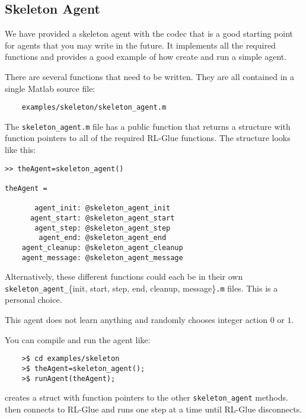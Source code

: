 \documentclass[11pt]{article}
\begin{document}
\subsection{Skeleton Agent}
\label{sec:agent}
We have provided a skeleton agent with the codec that is a good starting point for agents that you may write in the future.
It implements all the required functions and provides a good example of how create and run a simple agent.

There are several functions that need to be written. They are all contained in a single Matlab source file:
\begin{verbatim}
	examples/skeleton/skeleton_agent.m
\end{verbatim}

The \texttt{skeleton\_agent.m} file has a public function that returns a structure with function pointers to all of the required RL-Glue functions.  The structure looks like this:

\begin{verbatim}
>> theAgent=skeleton_agent()

theAgent = 

       agent_init: @skeleton_agent_init
      agent_start: @skeleton_agent_start
       agent_step: @skeleton_agent_step
        agent_end: @skeleton_agent_end
    agent_cleanup: @skeleton_agent_cleanup
    agent_message: @skeleton_agent_message
\end{verbatim}

Alternatively, these different functions could each be in their own \texttt{skeleton\_agent\_}\{init, start, step, end, cleanup, message\}\texttt{.m} files.  This is a personal choice.

This agent does not learn anything and randomly chooses integer action $0$ or $1$.  

You can compile and run the agent like:
\begin{verbatim}
	>$ cd examples/skeleton
	>$ theAgent=skeleton_agent();
	>$ runAgent(theAgent);
\end{verbatim}

 creates a struct with function pointers to the other \texttt{skeleton\_agent} methods.   then
connects to RL-Glue and runs one step at a time until RL-Glue disconnects.
\end{document}
